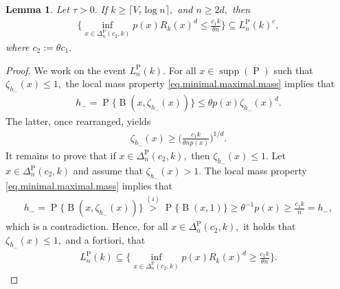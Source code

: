 \documentclass[10pt]{article}
\newcommand{\B}{\operatorname{B}}
\renewcommand{\P}{\operatorname{P}}
\newcommand{\supp}{\operatorname{supp}}
\newtheorem{lemma}[theorem]{Lemma}
\begin{document}
\begin{lemma}
    \label{lem.lower.bound.neighbours.density}
    Let $\tau > 0.$ If $k \geq \lceil V_\tau\log n\rceil,$ and $n \geq 2d,$ then
    \begin{align*}
        \Bigg\{\inf_{x \in \Delta_n^{\P}(c_2, k)}p(x)R_k(x)^d \leq \frac{c_1 k}{\theta n}\Bigg\} \subseteq L_n^{\P}(k)^c,
    \end{align*}
    where $c_2 := \theta c_1.$
\end{lemma}

\begin{proof}
    We work on the event $L_n^{\P}(k).$ For all $x \in \supp(\P)$ such that $\zeta_{h_-}(x) \leq 1,$ the local mass property \eqref{eq.minimal.maximal.mass} implies that
    \begin{align*}
        h_- = \P\{\B(x, \zeta_{h_-}(x))\} \leq \theta p(x)\zeta_{h_-}(x)^d.
    \end{align*}
    The latter, once rearranged, yields
    \begin{align*}
        \zeta_{h_-}(x) \geq \bigg(\frac{c_1 k}{\theta np(x)}\bigg)^{1/d}.
    \end{align*}
    It remains to prove that if $x \in \Delta_n^{\P}(c_2, k),$ then $\zeta_{h_-}(x) \leq 1.$ Let $x \in \Delta_n^{\P}(c_2, k)$ and assume that $\zeta_{h_-}(x) > 1.$ The local mass property \eqref{eq.minimal.maximal.mass} implies that
    \begin{align*}
        h_- = \P\{\B(x, \zeta_{h_-}(x))\} \overset{(i)}{>} \P\{\B(x, 1)\} \geq \theta^{-1}p(x) \geq \frac{c_1 k}{n} = h_-,
    \end{align*}
    which is a contradiction. Hence, for all $x \in \Delta_n^{\P}(c_2, k),$ it holds that $\zeta_{h_-}(x) \leq 1,$ and a fortiori, that
    \begin{align*}
        L_n^{\P}(k) \subseteq \Bigg\{\inf_{x \in \Delta_n^{\P}(c_2, k)} p(x) R_k(x)^d \geq \frac{c_1 k}{\theta n}\Bigg\}.
    \end{align*}
\end{proof}
\end{document}
